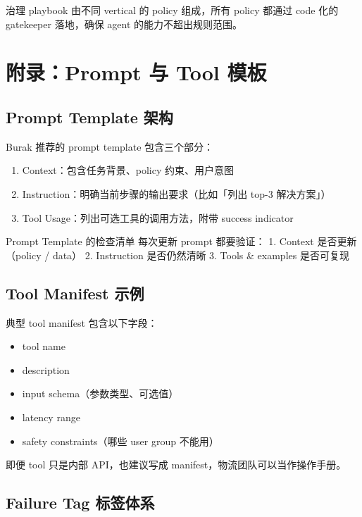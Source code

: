 \documentclass[a4paper]{article}
\begin{document}
治理 playbook 由不同 vertical 的 policy 组成，所有 policy 都通过 code 化的 gatekeeper 落地，确保 agent 的能力不超出规则范围。

\section{附录：Prompt 与 Tool 模板}

\subsection{Prompt Template 架构}

Burak 推荐的 prompt template 包含三个部分：

\begin{enumerate}
    \item Context：包含任务背景、policy 约束、用户意图
    \item Instruction：明确当前步骤的输出要求（比如「列出 top-3 解决方案」）
    \item Tool Usage：列出可选工具的调用方法，附带 success indicator
\end{enumerate}

\begin{knowledgebox}{Prompt Template 的检查清单}
每次更新 prompt 都要验证：
1. Context 是否更新（policy / data）
2. Instruction 是否仍然清晰
3. Tools \& examples 是否可复现
\end{knowledgebox}

\subsection{Tool Manifest 示例}

典型 tool manifest 包含以下字段：

\begin{itemize}
    \item tool name
    \item description
    \item input schema（参数类型、可选值）
    \item latency range
    \item safety constraints（哪些 user group 不能用）
\end{itemize}

即便 tool 只是内部 API，也建议写成 manifest，物流团队可以当作操作手册。

\subsection{Failure Tag 标签体系}
\end{document}
